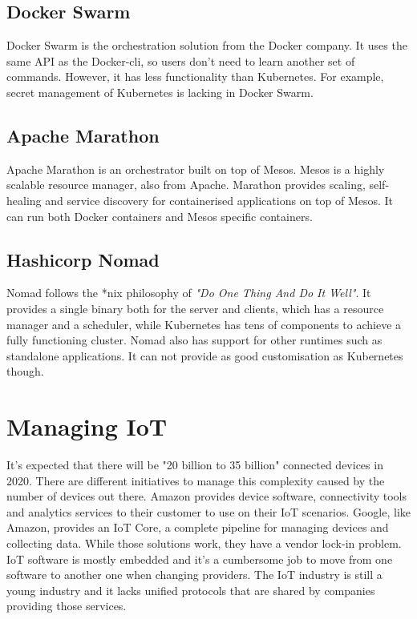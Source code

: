 \subsection*{Docker Swarm}
Docker Swarm is the orchestration solution from the Docker company. It uses the same API as the Docker-cli, so users don't need to learn another set of commands. However, it has less functionality than Kubernetes. For example, secret management of Kubernetes is lacking in Docker Swarm.

\subsection*{Apache Marathon}
Apache Marathon is an orchestrator built on top of Mesos. Mesos is a highly scalable resource manager, also from Apache. Marathon provides scaling, self-healing and service discovery for containerised applications on top of Mesos. It can run both Docker containers and Mesos specific containers.

\subsection*{Hashicorp Nomad}
Nomad follows the *nix philosophy of \textit{"Do One Thing And Do It Well"}. It provides a single binary both for the server and clients, which has a resource manager and a scheduler, while Kubernetes has tens of components to achieve a fully functioning cluster. Nomad also has support for other runtimes such as standalone applications. It can not provide as good customisation as Kubernetes though.

\section{Managing IoT}
It's expected that there will be "20 billion to 35 billion" \cite{unikernels-improve} connected devices in 2020. There are different initiatives to manage this complexity caused by the number of devices out there. Amazon provides device software, connectivity tools and analytics services to their customer to use on their IoT scenarios. Google, like Amazon, provides an IoT Core, a complete pipeline for managing devices and collecting data. While those solutions work, they have a vendor lock-in problem. IoT software is mostly embedded and it's a cumbersome job to move from one software to another one when changing providers. The IoT industry is still a young industry and it lacks unified protocols that are shared by companies providing those services.

